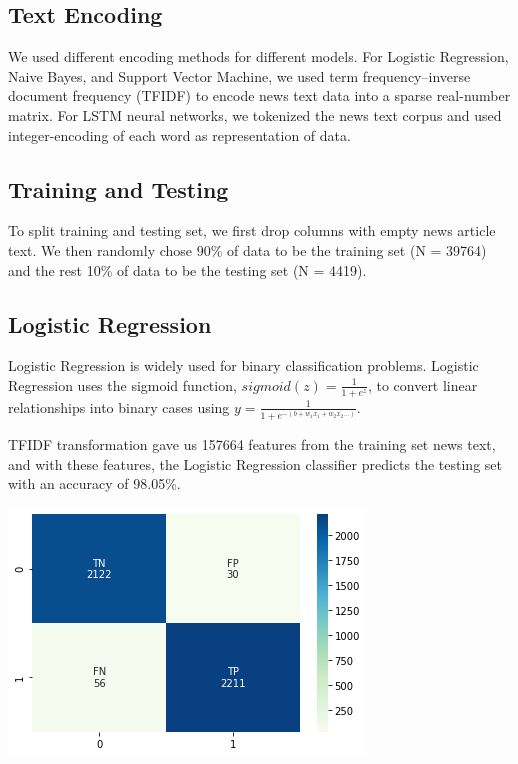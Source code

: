 \documentclass{article}
\begin{document}
\begin{multicols}{2}
\subsection{Text Encoding}
We used different encoding methods for different models. 
For Logistic Regression, Naive Bayes, and Support Vector Machine, we used term frequency–inverse document frequency (TFIDF) to encode news text data into a sparse real-number matrix. For LSTM neural networks, we tokenized the news text corpus and used integer-encoding of each word as representation of data.

\subsection{Training and Testing}
To split training and testing set, we first drop columns with empty news article text. We then randomly chose 90\% of data to be the training set (N = 39764) and the rest 10\% of data to be the testing set (N = 4419).

\subsection{Logistic Regression}
Logistic Regression is widely used for binary classification problems. Logistic Regression uses the sigmoid function, $sigmoid(z)=  \frac{1}{1+e^{z}}$, to convert linear relationships into binary cases using $y=\frac{1}{1+e^{-(b+w_1x_1+w_2x_2...)}}$. 

TFIDF transformation gave us 157664 features from the training set news text, and with these features, the Logistic Regression classifier predicts the testing set with an accuracy of 98.05\%.

\includegraphics[scale=0.6]{images/lrcm.png}


\end{multicols}
\end{document}
